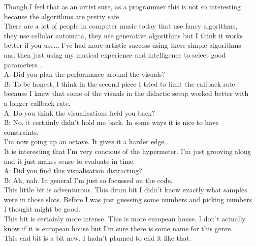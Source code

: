 \documentclass[12pt]{article}
\begin{document}
Though I feel that as an artist sure, as a programmer this is not so interesting because the algorithms are pretty safe.\\

There are a lot of people in computer music today that use fancy algorithms, they use cellular automata, they use generative algorithms but I think it works better if you use... I've had more artistic success using these simple algorithms and then just using my musical experience and intelligence to select good parameters...\\

A: Did you plan the performance around the visuals?\\

B: To be honest, I think in the second piece I tried to limit the callback rate because I knew that some of the visuals in the didactic setup worked better with a longer callback rate.\\

A: Do you think the visualisations held you back?\\

B: No, it certainly didn't hold me back. In some ways it is nice to have constraints.\\

I'm now going up an octave. It gives it a harder edge...\\

It is interesting that I'm very concious of the hypermeter. I'm just grooving along and it just makes sense to evaluate in time.\\

A: Did you find this visualisation distracting?\\

B: Ah, nah. In general I'm just so focussed on the code.\\

This little bit is adventurous. This drum bit I didn't know exactly what samples were in those slots. Before I was just guessing some numbers and picking numbers I thought might be good.\\

This bit is certainly more intense. This is more european house. I don't actually know if it is european house but I'm sure there is some name for this genre.\\

This end bit is a bit new. I hadn't planned to end it like that.\\
\end{document}
